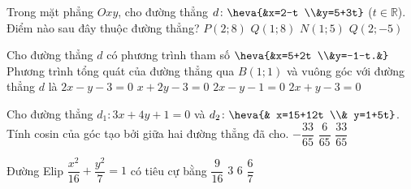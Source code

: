 \begin{ex}%
Trong mặt phẳng $Oxy$, cho đường thẳng $d\colon\heva{&x=2-t \\&y=5+3t}$ ($t\in\mathbb{R}$). Điểm nào sau đây thuộc đường thẳng?
\choice
{$P(2;8)$}
{\True $Q(1;8)$}
{$N(1;5)$}
{$Q(2;-5)$}
\end{ex}

\begin{ex}%
Cho đường thẳng $d$ có phương trình tham số $\heva{&x=5+2t \\&y=-1-t.&}$ Phương trình tổng quát của đường thẳng qua $B(1; 1)$ và vuông góc với đường thẳng $d$ là
\choice
{$2x-y-3=0$}
{$x+2y-3=0$}
{\True $2x-y-1=0$}
{$2x+y-3=0$}
\end{ex}

\begin{ex}%
Cho đường thẳng $d_{1} \colon 3x+4y+1=0$ và $d_{2}  \colon \heva{& x=15+12t \\& y=1+5t}$. Tính cosin của góc tạo bởi giữa hai đường thẳng đã cho.
{$-\dfrac{33}{65}$}
{$\dfrac{6}{65}$}
{\True $\dfrac{33}{65}$}
\end{ex}

\begin{ex}%
Đường Elip $\dfrac{x^2}{16}+\dfrac{y^2}{7}=1$ có tiêu cự bằng
\choice
{$\dfrac{9}{16}$}
{$3$}
{\True $6$}
{$\dfrac{6}{7}$}
\end{ex}

